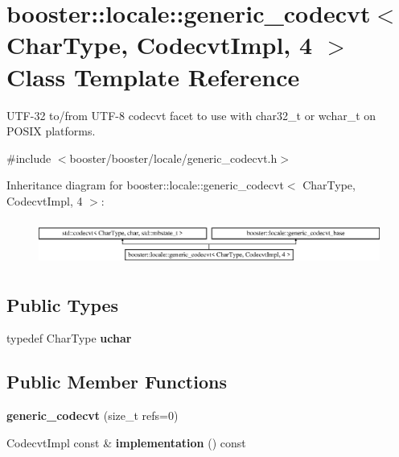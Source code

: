 \section{booster\+:\+:locale\+:\+:generic\+\_\+codecvt$<$ Char\+Type, Codecvt\+Impl, 4 $>$ Class Template Reference}
\label{classbooster_1_1locale_1_1generic__codecvt_3_01CharType_00_01CodecvtImpl_00_014_01_4}


U\+T\+F-\/32 to/from U\+T\+F-\/8 codecvt facet to use with char32\+\_\+t or wchar\+\_\+t on P\+O\+S\+IX platforms.  




{\ttfamily \#include $<$booster/booster/locale/generic\+\_\+codecvt.\+h$>$}

Inheritance diagram for booster\+:\+:locale\+:\+:generic\+\_\+codecvt$<$ Char\+Type, Codecvt\+Impl, 4 $>$\+:\begin{figure}[H]
\begin{center}
\leavevmode
\includegraphics[height=1.485411cm]{classbooster_1_1locale_1_1generic__codecvt_3_01CharType_00_01CodecvtImpl_00_014_01_4}
\end{center}
\end{figure}
\subsection*{Public Types}
\begin{DoxyCompactItemize}
\item 
typedef Char\+Type {\bfseries uchar}\label{classbooster_1_1locale_1_1generic__codecvt_3_01CharType_00_01CodecvtImpl_00_014_01_4_a11b6a3f5335c7318985b03264fc3668c}

\end{DoxyCompactItemize}
\subsection*{Public Member Functions}
\begin{DoxyCompactItemize}
\item 
{\bfseries generic\+\_\+codecvt} (size\+\_\+t refs=0)\label{classbooster_1_1locale_1_1generic__codecvt_3_01CharType_00_01CodecvtImpl_00_014_01_4_a7c98962aaf58abc204cf5600c4e6cd5d}

\item 
Codecvt\+Impl const \& {\bfseries implementation} () const \label{classbooster_1_1locale_1_1generic__codecvt_3_01CharType_00_01CodecvtImpl_00_014_01_4_a9ca277a779e374b940ca47a05fff3161}

\end{DoxyCompactItemize}

